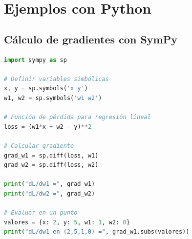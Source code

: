 \documentclass[12pt,a4paper,openany,oneside]{book}
\begin{document}

\section{Ejemplos con Python}

\subsection{Cálculo de gradientes con SymPy}
\begin{lstlisting}[language=Python]
import sympy as sp

# Definir variables simbólicas
x, y = sp.symbols('x y')
w1, w2 = sp.symbols('w1 w2')

# Función de pérdida para regresión lineal
loss = (w1*x + w2 - y)**2

# Calcular gradiente
grad_w1 = sp.diff(loss, w1)
grad_w2 = sp.diff(loss, w2)

print("dL/dw1 =", grad_w1)
print("dL/dw2 =", grad_w2)

# Evaluar en un punto
valores = {x: 2, y: 5, w1: 1, w2: 0}
print("dL/dw1 en (2,5,1,0) =", grad_w1.subs(valores))
\end{lstlisting}
\end{document}
